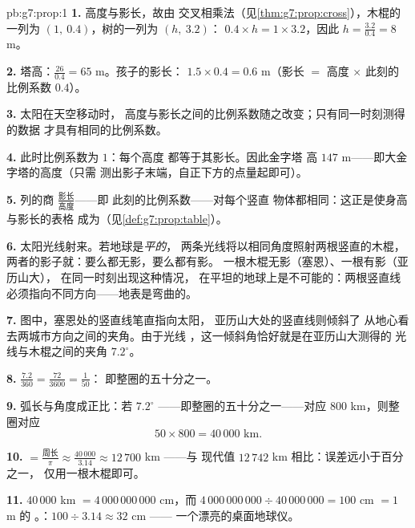 \begin{solution}{pb:g7:prop:1}
\textbf{1.} 高度与影长，故由
交叉相乘法（见\cref{thm:g7:prop:cross}），木棍的一列为
$(1,\ 0.4)$，树的一列为 $(h,\ 3.2)$：
$0.4 \times h = 1 \times 3.2$，因此
$h = \frac{3.2}{0.4} = 8$ m。

\textbf{2.} 塔高：$\frac{26}{0.4} = 65$ m。孩子的影长：
$1.5 \times 0.4 = 0.6$ m（影长 $=$ 高度 $\times$ 此刻的
比例系数 $0.4$）。

\textbf{3.} 太阳在天空移动时，
高度与影长之间的比例系数随之改变；只有同一时刻测得的数据
才具有相同的比例系数。

\textbf{4.} 此时比例系数为 $1$：每个高度
都等于其影长。因此金字塔
高 $147$ m——即大金字塔的高度（只需
测出影子末端，自正下方的点量起即可）。

\textbf{5.} 列的商
$\frac{\text{影长}}{\text{高度}}$——即
此刻的比例系数——对每个竖直
物体都相同：这正是使身高与影长的表格
成为（见\cref{def:g7:prop:table}）。

\textbf{6.} 太阳光线射来。若地球是\emph{平的}，
两条光线将以相同角度照射两根竖直的木棍，
两者的影子就：要么都无影，要么都有影。
一根木棍无影（塞恩）、一根有影（亚历山大），
在同一时刻出现这种情况，
在平坦的地球上是不可能的：两根竖直线
必须指向不同方向——地表是弯曲的。

\textbf{7.} 图中，塞恩处的竖直线笔直指向太阳，
亚历山大处的竖直线则倾斜了
从地心看去两城市方向之间的夹角。由于光线
，这一倾斜角恰好就是在亚历山大测得的
光线与木棍之间的夹角 $7.2^\circ$。

\textbf{8.} $\frac{7.2}{360} = \frac{72}{3600} = \frac{1}{50}$：
即整圈的五十分之一。

\textbf{9.} 弧长与角度成正比：若
$7.2^\circ$ ——即整圈的五十分之一——对应
$800$ km，则整圈对应
\[
50 \times 800 = 40\,000 \text{ km}.
\]

\textbf{10.}  $= \frac{\text{周长}}{\pi}
\approx \frac{40\,000}{3.14} \approx 12\,700$ km ——与
现代值 $12\,742$ km 相比：误差远小于百分之一，
仅用一根木棍即可。

\textbf{11.} $40\,000$ km $= 4\,000\,000\,000$ cm，而
$4\,000\,000\,000 \div 40\,000\,000 = 100$ cm $= 1$ m 的
。：$100 \div 3.14 \approx 32$ cm ——
一个漂亮的桌面地球仪。


\end{solution}
